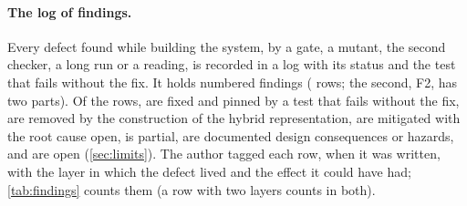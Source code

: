 \paragraph{The log of findings.}
Every defect found while building the system, by a gate, a mutant, the second checker, a long run or a reading, is recorded in a log with its status and the test that fails without the fix.
It holds \findNumbers{} numbered findings (\findRows{} rows; the second, F2, has two parts).
Of the rows, \findFixed{} are fixed and pinned by a test that fails without the fix, \findConstruction{} are removed by the construction of the hybrid representation, \findMitigated{} are mitigated with the root cause open, \findPartial{} is partial, \findDocumented{} are documented design consequences or hazards, and \findOpen{} are open (\cref{sec:limits}).
The author tagged each row, when it was written, with the layer in which the defect lived and the effect it could have had; \cref{tab:findings} counts them (a row with two layers counts in both).

